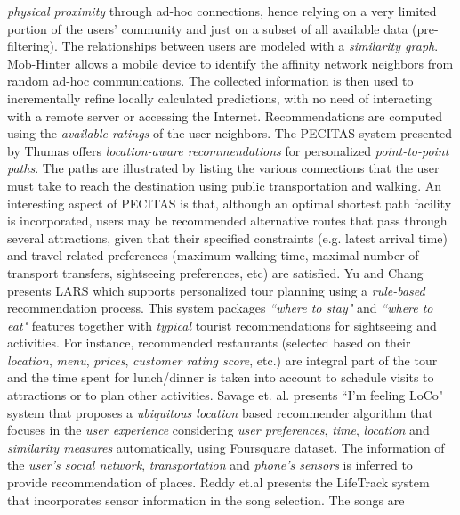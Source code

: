 \textit{physical proximity} through ad-hoc connections, hence 
relying on a very limited portion of the users' community and just 
on a subset of all available data (pre-filtering). The relationships 
between users are modeled with a \textit{similarity graph}. Mob-Hinter 
allows a mobile device to identify the affinity network neighbors 
from random ad-hoc communications. The collected information 
is then used to incrementally refine locally
calculated predictions, with no need of interacting with a remote
server or accessing the Internet. Recommendations are computed
using the \textit{available ratings} of the user neighbors.
The PECITAS system \cite{tumas2009personalized} presented by Thumas 
offers \textit{location-aware recommendations} for personalized 
\textit{point-to-point  paths}. The paths are illustrated by listing 
the various connections that the user must take to reach the 
destination using public transportation and walking. An
interesting aspect of PECITAS is that, although an optimal shortest 
path facility is incorporated, users may be recommended alternative 
routes that pass through several attractions, given that
their specified constraints (e.g. latest arrival time) and travel-related 
preferences (maximum walking time, maximal number of transport
transfers, sightseeing preferences, etc) are satisfied. 
Yu and Chang presents LARS \cite{yu2009personalized} 
which supports personalized tour planning using a \textit{rule-based} 
recommendation process. This system
packages \textit{``where to stay"} and \textit{``where to eat"} 
features together with \textit{typical} tourist recommendations 
for sightseeing and activities. For
instance, recommended restaurants (selected based on their 
\textit{location}, \textit{menu},  \textit{prices}, \textit{customer rating score}, 
etc.) are integral part of the tour and the time spent for 
lunch/dinner is taken into account to schedule visits to 
attractions or to plan other activities.
Savage et. al. presents  ``I'm feeling LoCo" system \cite{savage2012m}
that proposes a \textit{ubiquitous location­} based recommender algorithm
that focuses in the \textit{user experience} considering 
\textit{user preferences}, \textit{time}, \textit{location} and 
\textit{similarity measures} automatically, using Foursquare
dataset. The information of the \textit{user's social network},
\textit{transportation} and \textit{phone's sensors} is inferred to provide
recommendation of places.
Reddy et.al\cite{reddy2006lifetrak} presents the LifeTrack system that
incorporates sensor information in the song selection. The songs are

